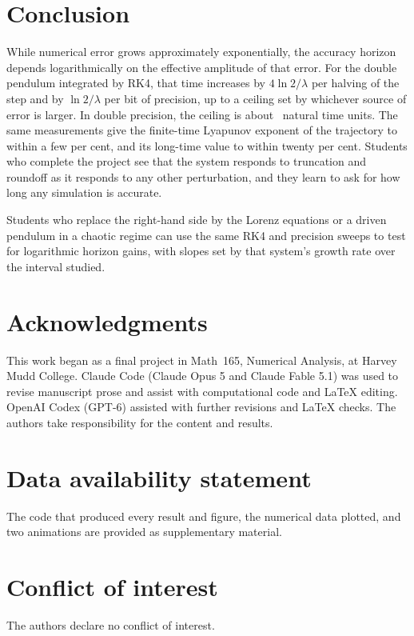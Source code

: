 \documentclass[12pt,a4paper]{article}
\begin{document}
\section{Conclusion}

While numerical error grows approximately exponentially, the accuracy horizon
depends logarithmically on the effective amplitude of that error. For the double pendulum
integrated by RK4, that time increases by $4\ln2/\lambda$ per halving of the
step and by $\ln2/\lambda$ per bit of precision, up to a ceiling set by
whichever source of error is larger. In double precision, the ceiling is about
\TBestDouble\ natural time units. The same measurements give the finite-time
Lyapunov exponent of the trajectory to within a few per cent, and its long-time
value to within twenty per cent. Students who complete the project see that the
system responds to truncation and roundoff as it responds to any other
perturbation, and they learn to ask for how long any simulation is accurate.

Students who replace the right-hand side by the Lorenz equations or a driven
pendulum in a chaotic regime can use the same RK4 and precision sweeps to test
for logarithmic horizon gains, with slopes set by that system's growth rate
over the interval studied.

\section*{Acknowledgments}
This work began as a final project in Math~165, Numerical Analysis, at Harvey
Mudd College. Claude Code (Claude Opus 5 and Claude Fable 5.1) was used to
revise manuscript prose and assist with computational code and LaTeX editing.
OpenAI Codex (GPT-6) assisted with further revisions and LaTeX checks. The
authors take responsibility for the content and results.

\section*{Data availability statement}
The code that produced every result and figure, the numerical data plotted, and
two animations are provided as supplementary material.

\section*{Conflict of interest}
The authors declare no conflict of interest.



\end{document}
